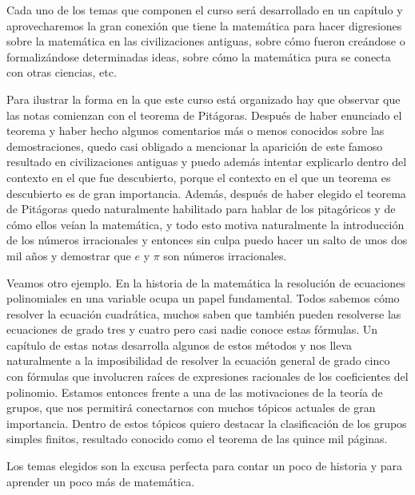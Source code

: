 Cada uno de los temas que componen el curso será desarrollado en un capítulo y
aprovecharemos la gran conexión que tiene la matemática para hacer digresiones
sobre la matemática en las civilizaciones antiguas, sobre cómo fueron creándose
o formalizándose determinadas ideas, sobre cómo la matemática pura se conecta
con otras ciencias, etc. 

Para ilustrar la forma en la que este curso está organizado hay que observar
que las notas comienzan con el teorema de Pitágoras. Después de haber enunciado
el teorema y haber hecho algunos comentarios más o menos conocidos sobre las
demostraciones, quedo casi obligado a mencionar la aparición de este famoso
resultado en civilizaciones antiguas y puedo además intentar explicarlo dentro
del contexto en el que fue descubierto, porque el contexto en el que un teorema
es descubierto es de gran importancia.  Además, después de haber elegido el
teorema de Pitágoras quedo naturalmente habilitado para hablar de los
pitagóricos y de cómo ellos veían la matemática, y todo esto motiva
naturalmente la introducción de los números irracionales y entonces sin culpa
puedo hacer un salto de unos dos mil años y demostrar que $e$ y $\pi$ son
números irracionales.

Veamos otro ejemplo. En la historia de la matemática la resolución de
ecuaciones polinomiales en una variable ocupa un papel fundamental. Todos
sabemos cómo resolver la ecuación cuadrática, muchos saben que también pueden
resolverse las ecuaciones de grado tres y cuatro pero casi nadie conoce estas
fórmulas. Un capítulo de estas notas desarrolla algunos de estos métodos y nos
lleva naturalmente a la imposibilidad de resolver la ecuación general de grado
cinco con fórmulas que involucren raíces de expresiones racionales de los
coeficientes del polinomio. Estamos entonces frente a una de las motivaciones
de la teoría de grupos, que nos permitirá conectarnos con muchos tópicos
actuales de gran importancia. Dentro de estos tópicos quiero destacar la
clasificación de los grupos simples finitos, resultado conocido como el teorema
de las quince mil páginas. 

Los temas elegidos son la excusa perfecta para contar un poco de historia y
para aprender un poco más de matemática. 

